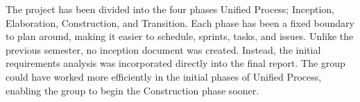 The project has been divided into the four phases Unified Process; Inception,
Elaboration, Construction, and Transition. Each phase has been a fixed boundary
to plan around, making it easier to schedule, sprints, tasks, and issues.
Unlike the previous semester, no inception document was created. Instead, the
initial requirements analysis was incorporated directly into the final report.
The group could have worked more efficiently in the initial phases of Unified
Process, enabling the group to begin the Construction phase sooner.
